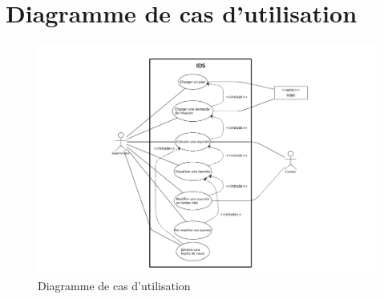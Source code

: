 \chapter{Diagramme de cas d’utilisation}

\begin{figure}[h]
    \centering
    \includegraphics[width=140mm]{../diagrams/use_case/use_case_diagram.png}
    \caption{Diagramme de cas d’utilisation}
    \label{diagram:use_case}
\end{figure}
